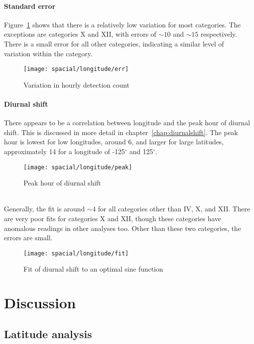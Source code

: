 \paragraph{Standard error\\}
Figure~\ref{fig:spac:lon:err} shows that there is a relatively low variation for most categories. The exceptions are categories X and XII, with errors of $\sim 10$ and $\sim 15$ respectively. There is a small error for all other categories, indicating a similar level of variation within the category.
\begin{figure}[h!]
	\centering
	\texttt{[image: spacial/longitude/err]}
	\caption{Variation in hourly detection count
		\label{fig:spac:lon:err}}
\end{figure}
\paragraph{Diurnal shift\\}
There appears to be a correlation between longitude and the peak hour of diurnal shift. This is discussed in more detail in chapter~\ref{chap:diurnalshift}. The peak hour is lowest for low longitudes, around 6, and larger for large latitudes, approximately 14 for a longitude of -125$^{\circ}$ and 125$^{\circ}$.
\begin{figure}[h!]
	\centering
	\texttt{[image: spacial/longitude/peak]}
	\caption{Peak hour of diurnal shift
		\label{fig:spac:lon:peak}}
\end{figure}\\
Generally, the fit is around $\sim 4$ for all categories other than IV, X, and XII. There are very poor fits for categories X and XII, though these categories have anomalous readings in other analyses too. Other than these two categories, the errors are small.
\begin{figure}[h!]
	\centering
	\texttt{[image: spacial/longitude/fit]}
	\caption{Fit of diurnal shift to an optimal sine function
		\label{fig:spac:lon:fit}}
\end{figure}

\section{Discussion}
\subsection{Latitude analysis}
